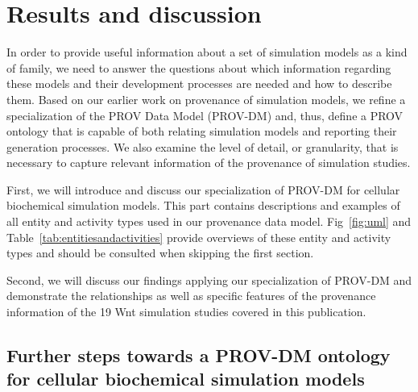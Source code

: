 \documentclass[10pt,letterpaper]{article}
\newcommand{\wnt}{Wnt}
\begin{document}
\section*{Results and discussion}\label{sec:ResultsAndDiscussion}

In order to provide useful information about a set of simulation models as a kind of family, we need to answer the questions about which information regarding these models and their development processes are needed and how to describe them.
Based on our earlier work on provenance of simulation models, we refine a specialization of the PROV Data Model (PROV-DM) and, thus, define a PROV ontology that is capable of both relating simulation models and reporting their generation processes.
We also examine the level of detail, or granularity, that is necessary to capture relevant information of the provenance of simulation studies.

First, we will introduce and discuss our specialization of PROV-DM for cellular biochemical simulation models.
This part contains descriptions and examples of all entity and activity types used in our provenance data model.
Fig~\ref{fig:uml} and Table~\ref{tab:entitiesandactivities} provide overviews of these entity and activity types and should be consulted when skipping the first section.

Second, we will discuss our findings applying our specialization of PROV-DM and demonstrate the relationships as well as specific features of the provenance information of the 19 \wnt{} simulation studies covered in this publication.


\subsection*{Further steps towards a PROV-DM ontology for cellular biochemical simulation models}
\end{document}
